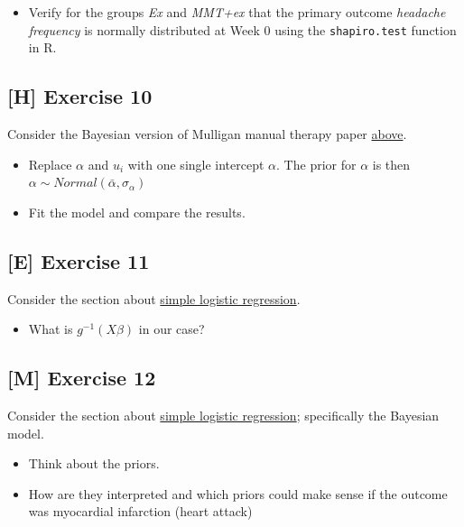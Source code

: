\documentclass[
]{book}
\providecommand{\tightlist}{%
  \setlength{\itemsep}{0pt}\setlength{\parskip}{0pt}}
\begin{document}
\begin{itemize}
\tightlist
\item
  Verify for the groups \emph{Ex} and \emph{MMT+ex} that the primary outcome \emph{headache frequency}
  is normally distributed at Week \(0\) using the \texttt{shapiro.test} function in R.
\end{itemize}

\subsection{{[}H{]} Exercise 10}\label{exercise10_LMM}

Consider the Bayesian version of Mulligan manual therapy paper \hyperref[mulligan_bayesian]{above}.

\begin{itemize}
\tightlist
\item
  Replace \(\alpha\) and \(u_i\) with one single intercept \(\alpha\).
  The prior for \(\alpha\) is then \(\alpha \sim Normal(\bar{\alpha}, \sigma_{\alpha})\)
\item
  Fit the model and compare the results.
\end{itemize}

\subsection{{[}E{]} Exercise 11}\label{exercise11_LMM}

Consider the section about \hyperref[simple_logistic_regression]{simple logistic regression}.

\begin{itemize}
\tightlist
\item
  What is \(g^{-1}(X \beta)\) in our case?
\end{itemize}

\subsection{{[}M{]} Exercise 12}\label{exercise12_LMM}

Consider the section about \hyperref[simple_logistic_regression]{simple logistic regression};
specifically the Bayesian model.

\begin{itemize}
\tightlist
\item
  Think about the priors.
\item
  How are they interpreted and which priors could make sense if the outcome was
  myocardial infarction (heart attack)
\end{itemize}
\end{document}
